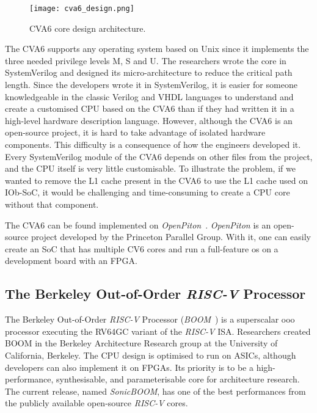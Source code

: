 \begin{figure}[!h]
    \centering
    \texttt{[image: cva6\_design.png]}
    \caption{CVA6 core design architecture.}
    \label{fig:cva6_design}
\end{figure}

The CVA6 supports any operating system based on Unix since it implements the three needed privilege levels M, S and U. The researchers wrote the core in SystemVerilog and designed its micro-architecture to reduce the critical path length. Since the developers wrote it in SystemVerilog, it is easier for someone knowledgeable in the classic Verilog and VHDL languages to understand and create a customised CPU based on the CVA6 than if they had written it in a high-level hardware description language. However, although the CVA6 is an open-source project, it is hard to take advantage of isolated hardware components. This difficulty is a consequence of how the engineers developed it. Every SystemVerilog module of the CVA6 depends on other files from the project, and the CPU itself is very little customisable. To illustrate the problem, if we wanted to remove the L1 cache present in the CVA6 to use the L1 cache used on IOb-SoC, it would be challenging and time-consuming to create a CPU core without that component.

The CVA6 can be found implemented on \textit{OpenPiton}~\cite{Balkind:2016:OOS:2872362.2872414}. \textit{OpenPiton} is an open-source project developed by the Princeton Parallel Group. With it, one can easily create an SoC that has multiple CV6 cores and run a full-feature \acrfull{os} on a development board with an FPGA.

\subsection{The Berkeley Out-of-Order \textit{RISC-V} Processor}
The Berkeley Out-of-Order \textit{RISC-V} Processor (\textit{BOOM}~\cite{zhaosonicboom}) is a superscalar \acrfull{ooo} processor executing the RV64GC variant of the \textit{RISC-V} ISA. Researchers created BOOM in the Berkeley Architecture Research group at the University of California, Berkeley. The CPU design is optimised to run on ASICs, although developers can also implement it on FPGAs. Its priority is to be a high-performance, synthesisable, and parameterisable core for architecture research. The current release, named \textit{SonicBOOM}, has one of the best performances from the publicly available open-source \textit{RISC-V} cores.


